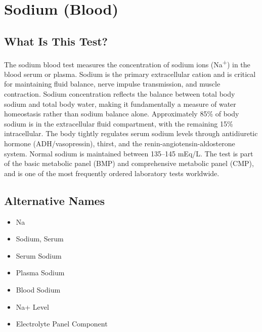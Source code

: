 \chapter{Sodium (Blood)}

\section*{What Is This Test?}
The sodium blood test measures the concentration of sodium ions (Na\textsuperscript{+}) in the blood serum or plasma. Sodium is the primary extracellular cation and is critical for maintaining fluid balance, nerve impulse transmission, and muscle contraction. Sodium concentration reflects the balance between total body sodium and total body water, making it fundamentally a measure of water homeostasis rather than sodium balance alone. Approximately 85\% of body sodium is in the extracellular fluid compartment, with the remaining 15\% intracellular. The body tightly regulates serum sodium levels through antidiuretic hormone (ADH/vasopressin), thirst, and the renin-angiotensin-aldosterone system. Normal sodium is maintained between 135--145 mEq/L. The test is part of the basic metabolic panel (BMP) and comprehensive metabolic panel (CMP), and is one of the most frequently ordered laboratory tests worldwide.

\section*{Alternative Names}
\begin{itemize}
  \item Na
  \item Sodium, Serum
  \item Serum Sodium
  \item Plasma Sodium
  \item Blood Sodium
  \item Na+ Level
  \item Electrolyte Panel Component
\end{itemize}
